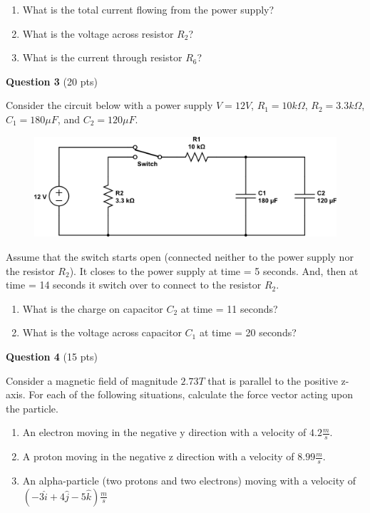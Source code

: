 \documentclass[14pt]{report}
\begin{document}
\begin{enumerate}[label=\Alph*]
\item What is the total current flowing from the power supply?
\item What is the voltage across resistor $R_2$?
\item What is the current through resistor $R_6$?
\end{enumerate}

\newpage
\textbf{Question 3} (20 pts)

Consider the circuit below with a power supply $V=12V$, $R_1 = 10k \Omega$, $R_2 = 3.3k \Omega$, $C_1 = 180 \mu F$, and $C_2 = 120 \mu F$. 

\begin{figure}[H]
\begin{center}
\includegraphics[scale=0.65]{exam2_3.png}
\end{center}
\end{figure}

Assume that the switch starts open (connected neither to the power supply nor the resistor $R_2$). It closes to the power supply at time = 5 seconds. And, then at time = 14 seconds it switch over to connect to the resistor $R_2$. 

\begin{enumerate}[label=\Alph*]
\item What is the charge on capacitor $C_2$ at time = 11 seconds?
\item What is the voltage across capacitor $C_1$ at time = 20 seconds?
\end{enumerate}

\textbf{Question 4} (15 pts)

Consider a magnetic field of magnitude $2.73 T$ that is parallel to the positive z-axis. For each of the following situations, calculate the force vector acting upon the particle.

\begin{enumerate}[label=\Alph*]
\item An electron moving in the negative y direction with a velocity of $4.2 \frac{m}{s}.$
\item A proton moving in the negative z direction with a velocity of $8.99 \frac{m}{s}.$
\item An alpha-particle (two protons and two electrons) moving with a velocity of $(-3 \hat{i} + 4 \hat{j} - 5 \hat{k}) \frac{m}{s}$
\end{enumerate}
\end{document}
